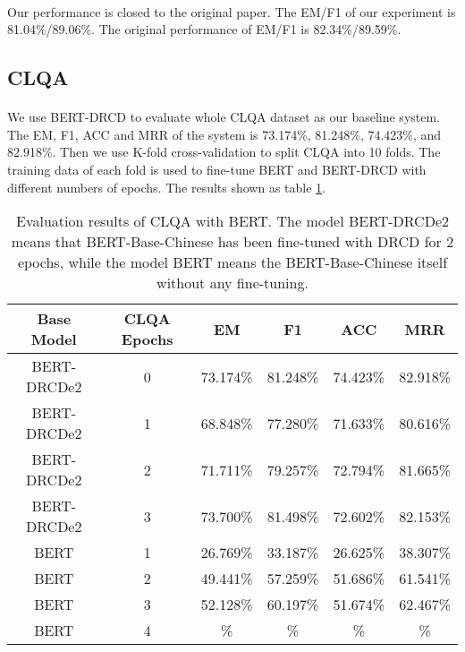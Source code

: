 \documentclass{article}
\begin{document}
\paragraph{}
Our performance is closed to the original paper. The EM/F1 of our experiment is 81.04\%/89.06\%. The original performance of EM/F1 is 82.34\%/89.59\%.

\subsection{CLQA}
\paragraph{}
We use BERT-DRCD to evaluate whole CLQA dataset as our baseline system. The EM, F1, ACC and MRR of the system is 73.174\%, 81.248\%, 74.423\%, and 82.918\%. Then we use K-fold cross-validation to split CLQA into 10 folds. The training data of each fold is used to fine-tune BERT and BERT-DRCD with different numbers of epochs. The results shown as table \ref{tab:bert-clqa}.

\begin{table}[h!]
  \centering
  \begin{tabular}{cccccc}
    Base Model & CLQA Epochs & EM & F1 & ACC & MRR\\
    \toprule
    BERT-DRCDe2 & 0 & 73.174\% & 81.248\% & 74.423\% & 82.918\% \\
    BERT-DRCDe2 & 1 & 68.848\% & 77.280\% & 71.633\% & 80.616\% \\
    BERT-DRCDe2 & 2 & 71.711\% & 79.257\% & 72.794\% & 81.665\% \\
    BERT-DRCDe2 & 3 & 73.700\% & 81.498\% & 72.602\% & 82.153\% \\
    BERT        & 1 & 26.769\% & 33.187\% & 26.625\% & 38.307\% \\
    BERT        & 2 & 49.441\% & 57.259\% & 51.686\% & 61.541\% \\
    BERT        & 3 & 52.128\% & 60.197\% & 51.674\% & 62.467\% \\
    BERT        & 4 & \% & \% & \% & \% \\
  \end{tabular}
  \caption{Evaluation results of CLQA with BERT. The model BERT-DRCDe2 means that BERT-Base-Chinese has been fine-tuned with DRCD for 2 epochs, while the model BERT means the BERT-Base-Chinese itself without any fine-tuning.}
  \label{tab:bert-clqa}
\end{table}
\end{document}
